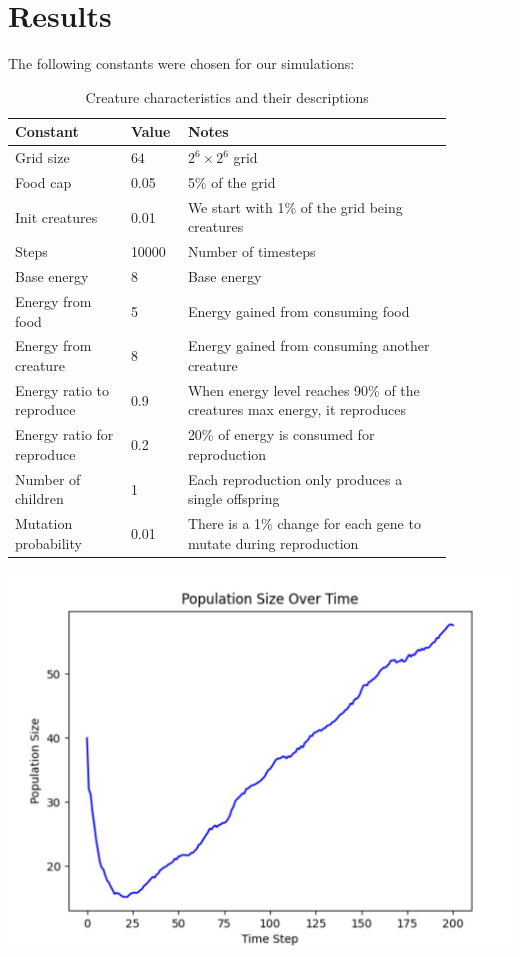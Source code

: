 \documentclass{report}
\begin{document}
\section{Results}
The following constants were chosen for our simulations:
\begin{table}[H]
    \begin{center}
        \begin{tabular}{|p{0.24\linewidth} |p{0.08\linewidth}|p{0.55\linewidth}|}
        \hline
        Constant & Value & Notes  \\\hline
        Grid size & \(64\) & \(2^6\times 2^6\) grid\\\hline        
        Food cap & 0.05 & 5\% of the grid\\\hline
        Init creatures & 0.01 & We start with 1\% of the grid being creatures\\\hline
        Steps & 10000 & Number of timesteps\\\hline
        Base energy & 8 & Base energy\\\hline
        Energy from food & 5 & Energy gained from consuming food\\\hline
        Energy from creature & 8 & Energy gained from consuming another creature\\\hline
        Energy ratio to reproduce & 0.9 & When energy level reaches 90\% of the creatures max energy, it reproduces\\\hline
        Energy ratio for reproduce & 0.2 & 20\% of energy is consumed for reproduction\\\hline
        Number of children & 1 & Each reproduction only produces a single offspring\\\hline
        Mutation probability & 0.01 & There is a 1\% change for each gene to mutate during reproduction\\\hline
    \end{tabular}
    \caption{Creature characteristics and their descriptions}
    \end{center}
    \end{table}
\begin{center}
    \includegraphics[scale=0.2]{images/image1.jpg}
\end{center}
\end{document}
